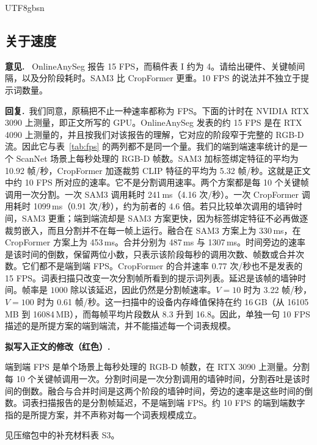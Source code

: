\documentclass[11pt]{article}
\newcommand{\revcomment}[1]{%
  \par\vspace{0.6em}\noindent\textcolor{revblue}{\textbf{意见.}}\ %
  \textcolor{revblue}{#1}\par\vspace{0.4em}}
\newcommand{\revresponse}[1]{%
  \par\noindent\textbf{回复.}\ #1\par\vspace{0.3em}}
\newcommand{\revchange}[1]{%
  \par\noindent\textbf{拟写入正文的修改（红色）.}\par
  \noindent\textcolor{revred}{#1}\par\vspace{0.8em}}
\begin{document}
\begin{CJK*}{UTF8}{gbsn}
\subsection*{关于速度}

\revcomment{OnlineAnySeg 报告 15 FPS，而稿件表 I 约为 4。请给出硬件、关键帧间隔，以及分阶段耗时。SAM3 比 CropFormer 更重。10 FPS 的说法并不独立于提示词数量。}

\revresponse{我们同意，原稿把不止一种速率都称为 FPS。下面的计时在 NVIDIA RTX 3090 上测量，即正文所写的 GPU。OnlineAnySeg 发表的约 15 FPS 是在 RTX 4090 上测量的，并且按我们对该报告的理解，它对应的阶段窄于完整的 RGB-D 流。因此它与表~\ref{tab:fps} 的两列都不是同一个量。我们的端到端速率统计的是一个 ScanNet 场景上每秒处理的 RGB-D 帧数。SAM3 加标签绑定特征的平均为 10.92 帧/秒，CropFormer 加逐裁剪 CLIP 特征的平均为 5.32 帧/秒。这就是正文中约 10 FPS 所对应的速率。它不是分割调用速率。两个方案都是每 10 个关键帧调用一次分割。一次 SAM3 调用耗时 241\,ms（4.16 次/秒）。一次 CropFormer 调用耗时 1099\,ms（0.91 次/秒），约为前者的 4.6 倍。若只比较单次调用的墙钟时间，SAM3 更重；端到端流却是 SAM3 方案更快，因为标签绑定特征不必再做逐裁剪嵌入，而且分割并不在每一帧上运行。融合在 SAM3 方案上为 330\,ms，在 CropFormer 方案上为 453\,ms。合并分别为 487\,ms 与 1307\,ms。时间旁边的速率是该时间的倒数，保留两位小数，只表示该阶段每秒的调用次数、帧数或合并次数。它们都不是端到端 FPS。CropFormer 的合并速率 0.77 次/秒也不是发表的 15 FPS。词表扫描只改变一次分割帧所看到的提示词列表。延迟是该帧的墙钟时间。帧率是 \(1000\) 除以该延迟，因此仍然是分割帧速率。\(V{=}10\) 时为 3.22 帧/秒，\(V{=}100\) 时为 0.61 帧/秒。这一扫描中的设备内存峰值保持在约 16\,GB（从 16105\,MB 到 16084\,MB），而每帧平均片段数从 8.3 升到 16.8。因此，单独一句 10 FPS 描述的是所提方案的端到端流，并不能描述每一个词表规模。}

\revchange{端到端 FPS 是单个场景上每秒处理的 RGB-D 帧数，在 RTX 3090 上测量。分割每 10 个关键帧调用一次。分割时间是一次分割调用的墙钟时间，分割吞吐是该时间的倒数。融合与合并时间是这两个阶段的墙钟时间，旁边的速率是这些时间的倒数。词表扫描报告的是分割帧延迟，不是端到端 FPS。约 10 FPS 的端到端数字指的是所提方案，并不声称对每一个词表规模成立。}

\noindent 见压缩包中的补充材料表 S3。


\end{CJK*}
\end{document}
